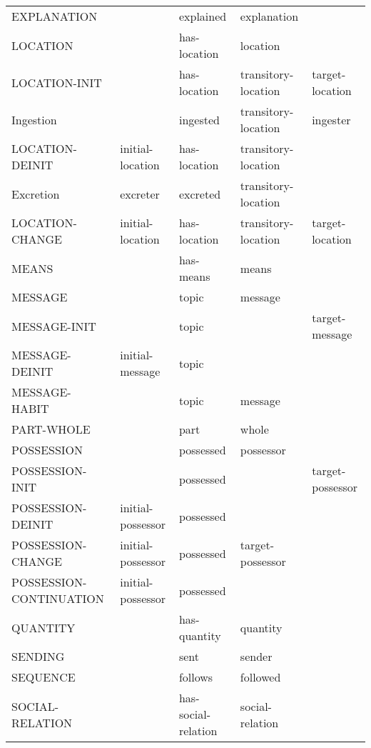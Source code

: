 \documentclass[a4paper]{article}
\newcommand{\fr}[1]{\textsf{#1}}
\newcommand{\rl}[1]{\textsf{#1}}
\begin{document}
\begin{table}
{\begin{tabular}{lllll}
            \fr{EXPLANATION} & & \rl{explained} & \rl{explanation} & \\
            \fr{LOCATION} & & \rl{has-location} & \rl{location} & \\
            \fr{LOCATION-INIT} & & \rl{has-location} & \rl{transitory-location} & \rl{target-location} \\
            \fr{Ingestion} & & \rl{ingested} & \rl{transitory-location} & \rl{ingester} \\
            \fr{LOCATION-DEINIT} & \rl{initial-location} & \rl{has-location} & \rl{transitory-location} & \\
            \fr{Excretion} & \rl{excreter} & \rl{excreted} & \rl{transitory-location} & \\
            \fr{LOCATION-CHANGE} & \rl{initial-location} & \rl{has-location} & \rl{transitory-location} & \rl{target-location} \\
            \fr{MEANS} & & \rl{has-means} & \rl{means} & \\
            \fr{MESSAGE} & & \rl{topic} & \rl{message} & \\
            \fr{MESSAGE-INIT} & & \rl{topic} & & \rl{target-message} \\
            \fr{MESSAGE-DEINIT} & \rl{initial-message} & \rl{topic} & & \\
            \fr{MESSAGE-HABIT} & & \rl{topic} & \rl{message} & \\
            \fr{PART-WHOLE} & & \rl{part} & \rl{whole} & \\
            \fr{POSSESSION} & & \rl{possessed} & \rl{possessor} & \\
            \fr{POSSESSION-INIT} & & \rl{possessed} & & \rl{target-possessor} \\
            \fr{POSSESSION-DEINIT} & \rl{initial-possessor} & \rl{possessed} & & \\
            \fr{POSSESSION-CHANGE} & \rl{initial-possessor} & \rl{possessed} & \rl{target-possessor} & \\
            \fr{POSSESSION-CONTINUATION} & \rl{initial-possessor} & \rl{possessed} & & \\
            \fr{QUANTITY} & & \rl{has-quantity} & \rl{quantity} & \\
            \fr{SENDING} & & \rl{sent} & \rl{sender} & \\
            \fr{SEQUENCE} & & \rl{follows} & \rl{followed} & \\
            \fr{SOCIAL-RELATION} & & \rl{has-social-relation} & \rl{social-relation} & \\

\end{tabular}}
\end{table}
\end{document}
